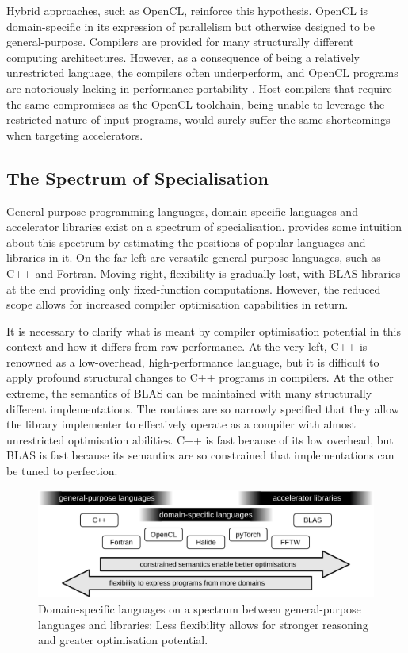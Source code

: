     Hybrid approaches, such as OpenCL, reinforce this hypothesis.
    OpenCL is domain-specific in its expression of parallelism but otherwise
    designed to be general-purpose.
    Compilers are provided for many structurally different computing
    architectures.
    However, as a consequence of being a relatively unrestricted language, the
    compilers often underperform, and OpenCL programs are notoriously lacking in
    performance portability \citep{Falch:2015:MLB:2863697.2864570}.
    Host compilers that require the same compromises as the OpenCL toolchain,
    being unable to leverage the restricted nature of input programs, would
    surely suffer the same shortcomings when targeting accelerators.

\subsection{The Spectrum of Specialisation}

    General-purpose programming languages, domain-specific languages and
    accelerator libraries exist on a spectrum of specialisation.
     provides some intuition about this spectrum by
    estimating the positions of popular languages and libraries in it.
    On the far left are versatile general-purpose languages, such as C++ and
    Fortran.
    Moving right, flexibility is gradually lost, with BLAS libraries at
    the end providing only fixed-function computations.
    However, the reduced scope allows for increased compiler optimisation
    capabilities in return.

    It is necessary to clarify what is meant by compiler optimisation potential
    in this context and how it differs from raw performance.
    At the very left, C++ is renowned as a low-overhead, high-performance
    language, but it is difficult to apply profound structural changes to C++
    programs in compilers.
    At the other extreme, the semantics of BLAS can be maintained with many
    structurally different implementations.
    The routines are so narrowly specified that they allow the library
    implementer to effectively operate as a compiler with almost
    unrestricted optimisation abilities.
    C++ is fast because of its low overhead, but BLAS is fast because
    its semantics are so constrained that implementations can be tuned to
    perfection.

\begin{figure}[t]
\centering
\includegraphics[width=\textwidth]{figures/DSLgradient}
\caption{Domain-specific languages on a spectrum between general-purpose
         languages and libraries:
         Less flexibility allows for stronger reasoning and greater
         optimisation potential.}
\label{specialgradient}
\end{figure}

